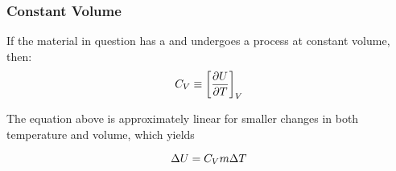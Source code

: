 \subsubsection{Constant Volume}\label{subsubsec:Specific_Heat_Constant_Volume}
If the material in question has a  and undergoes a process at constant volume, then:
\begin{equation*}
  C_{V} \equiv {\left[ \frac{\partial \ensuremath{U}}{\partial \ensuremath{T}} \right]}_{V}
\end{equation*}

The equation above is approximately linear for smaller changes in both temperature and volume, which yields 

\begin{equation}\label{eq:Change_Internal_Energy_Specific_Heat_Constant_Volume}
  \Delta U = C_{V} m \Delta T
\end{equation}



